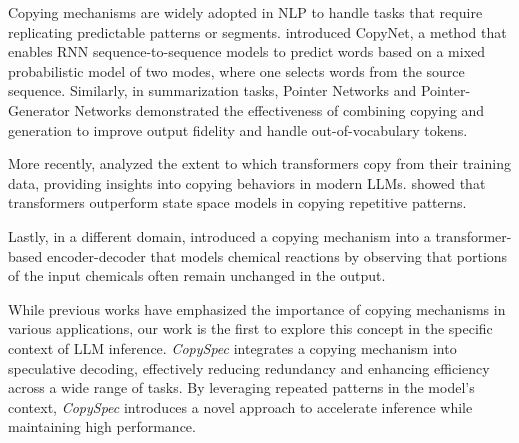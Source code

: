 Copying mechanisms are widely adopted in NLP to handle tasks that require replicating predictable patterns or segments. \citet{gu2016incorporating} introduced CopyNet, a method that enables RNN sequence-to-sequence models to predict words based on a mixed probabilistic model of two modes, where one selects words from the source sequence.
Similarly, in summarization tasks, Pointer Networks \cite{vinyals2015pointer} and Pointer-Generator Networks \cite{DBLP:journals/corr/SeeLM17} demonstrated the effectiveness of combining copying and generation to improve output fidelity and handle out-of-vocabulary tokens. 

More recently, \citet{mccoy2023how} analyzed the extent to which transformers copy from their training data, providing insights into copying behaviors in modern LLMs. \citet{jelassi2024repeat} showed that transformers outperform state space models in copying repetitive patterns. 

Lastly, in a different domain, \citet{andronov2024acceleratinginferencestringgenerationbased} introduced a copying mechanism into a transformer-based encoder-decoder that models chemical reactions by observing that  portions of the input chemicals often remain unchanged in the output.


While previous works have emphasized the importance of copying mechanisms in various applications, our work is the first to explore this concept in the specific context of LLM inference. \textit{CopySpec} integrates a 
copying mechanism into speculative decoding, effectively reducing redundancy and enhancing efficiency across a wide range of tasks. By leveraging repeated patterns in the model's context, \textit{CopySpec} introduces a novel approach to accelerate inference while maintaining high performance.

